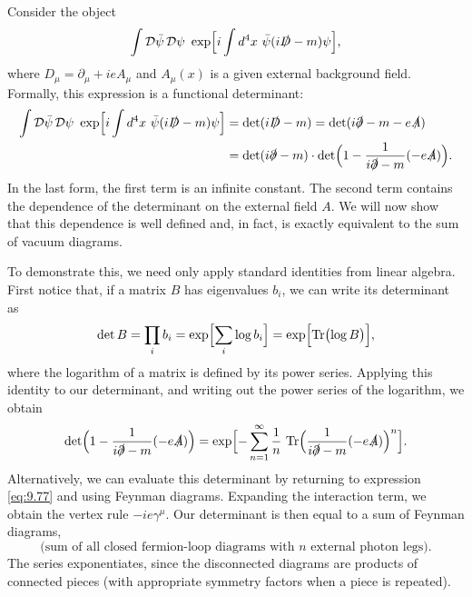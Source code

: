 Consider the object
\begin{equation}
  \int \mathcal{D}\bar{\psi}\,\mathcal{D}\psi\ \exp\Bigl[ i\int d^4x\
    \bar{\psi}(i\slashed{D}-m)\psi \Bigr],
  \label{eq:9.77}
\end{equation}
where $D_\mu = \partial_\mu + ieA_\mu$ and $A_\mu(x)$ is a given external
background field.  Formally, this expression is a functional determinant:
\begin{equation}
  \begin{aligned}
    \int \mathcal{D}\bar{\psi}\,\mathcal{D}\psi\ \exp\Bigl[ i\int d^4x\
      \bar{\psi}(i\slashed{D}-m)\psi \Bigr]
    &= \det(i\slashed{D}-m) = \det(i\slashed{\partial}-m - e\slashed{A})\\
    &= \det(i\slashed{\partial}-m)\cdot\det\Bigl( 1 -
      \frac{1}{i\slashed{\partial}-m}(-e\slashed{A}) \Bigr) .
  \end{aligned}
\end{equation}
In the last form, the first term is an infinite constant.  The second term
contains the dependence of the determinant on the external field $A$.  We will
now show that this dependence is well defined and, in fact, is exactly
equivalent to the sum of vacuum diagrams.

To demonstrate this, we need only apply standard identities from linear
algebra.  First notice that, if a matrix $B$ has eigenvalues $b_i$, we can
write its determinant as
\begin{equation}
  \det B = \prod_i b_i = \exp\Bigl[ \sum_i \log b_i \Bigr]
  = \exp\Bigl[ \mathrm{Tr}\bigl( \log B \bigr) \Bigr],
  \label{eq:9.78}
\end{equation}
where the logarithm of a matrix is defined by its power series.  Applying this
identity to our determinant, and writing out the power series of the
logarithm, we obtain
\begin{equation}
  \det\Bigl( 1 - \frac{1}{i\slashed{\partial}-m}(-e\slashed{A}) \Bigr)
  = \exp\Bigl[ -\sum_{n=1}^{\infty} \frac{1}{n}\ \mathrm{Tr}\Bigl(
    \frac{1}{i\slashed{\partial}-m}(-e\slashed{A}) \Bigr)^n \Bigr] .
  \label{eq:9.79}
\end{equation}
Alternatively, we can evaluate this determinant by returning to expression
\eqref{eq:9.77} and using Feynman diagrams.  Expanding the interaction term,
we obtain the vertex rule $-ie\gamma^\mu$.  Our determinant is then equal to a
sum of Feynman diagrams,
\begin{equation}
  \text{(sum of all closed fermion-loop diagrams with } n \text{ external
    photon legs)} .
  \label{eq:9.80}
\end{equation}
The series exponentiates, since the disconnected diagrams are products of
connected pieces (with appropriate symmetry factors when a piece is
repeated).

